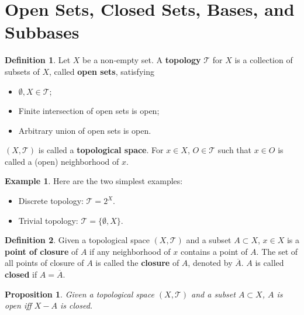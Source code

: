 \documentclass[openany]{book}
\newtheorem{proposition}{Proposition}[chapter]
\theoremstyle{definition}
\newtheorem{definition}{Definition}[chapter]
\newtheorem{example}{Example}[chapter]
\theoremstyle{remark}
\begin{document}
\section{Open Sets, Closed Sets, Bases, and Subbases}
\begin{definition}
    Let $X$ be a non-empty set. A \textbf{topology} $\mathcal{T}$ for $X$ is a collection of subsets of $X$, called \textbf{open sets}, satisfying
    \begin{itemize}
        \item $\emptyset,X\in \mathcal{T}$;
        \item Finite intersection of open sets is open;
        \item Arbitrary union of open sets is open.
    \end{itemize}
    $(X,\mathcal{T})$ is called a \textbf{topological space}. For $x\in X$, $O\in \mathcal{T}$ such that $x\in O$ is called a (open) neighborhood of $x$.
\end{definition}
\begin{example}
    Here are the two simplest examples:
    \begin{itemize}
        \item Discrete topology: $\mathcal{T}=2^X$.
        \item Trivial topology: $\mathcal{T}=\{\emptyset,X\}$.
    \end{itemize}
\end{example}
\begin{definition}
    Given a topological space $(X,\mathcal{T})$ and a subset $A\subset X$, $x\in X$ is a \textbf{point of closure} of $A$ if any neighborhood of $x$ contains a point of $A$. The set of all points of closure of $A$ is called the \textbf{closure} of $A$, denoted by $\overline{A}$. $A$ is called \textbf{closed} if $A=\overline{A}$.
\end{definition}
\begin{proposition}
    Given a topological space $(X,\mathcal{T})$ and a subset $A\subset X$, $A$ is open iff $X-A$ is closed.
\end{proposition}
\end{document}
